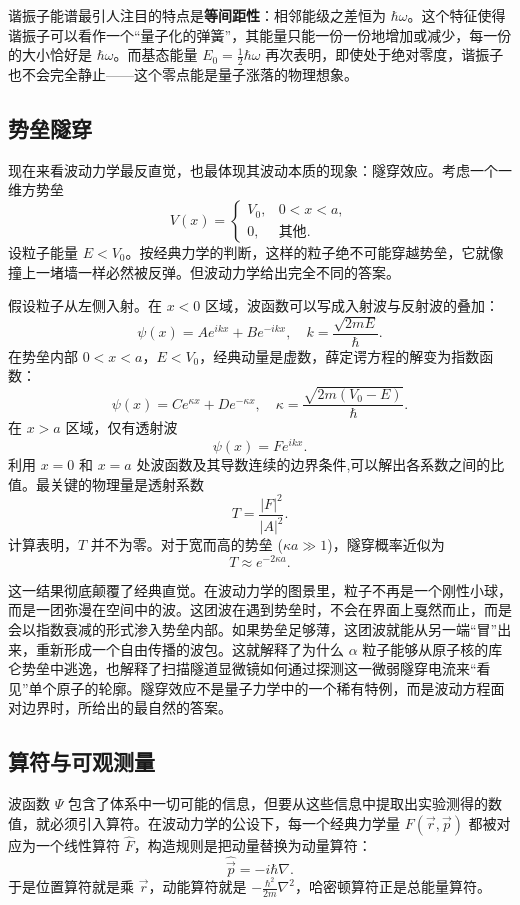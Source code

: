 \documentclass[UTF8]{ctexbook}
\begin{document}
谐振子能谱最引人注目的特点是\textbf{等间距性}：相邻能级之差恒为 $\hbar\omega$。这个特征使得谐振子可以看作一个“量子化的弹簧”，其能量只能一份一份地增加或减少，每一份的大小恰好是 $\hbar\omega$。而基态能量 $E_0 = \frac{1}{2}\hbar\omega$ 再次表明，即使处于绝对零度，谐振子也不会完全静止——这个零点能是量子涨落的物理想象。

\subsection{势垒隧穿}

现在来看波动力学最反直觉，也最体现其波动本质的现象：隧穿效应。考虑一个一维方势垒
\[
V(x) = \begin{cases}
V_0, & 0 < x < a,\\
0, & \text{其他}.
\end{cases}
\]
设粒子能量 $E < V_0$。按经典力学的判断，这样的粒子绝不可能穿越势垒，它就像撞上一堵墙一样必然被反弹。但波动力学给出完全不同的答案。

假设粒子从左侧入射。在 $x < 0$ 区域，波函数可以写成入射波与反射波的叠加：
\[
\psi(x) = A e^{ikx} + B e^{-ikx}, \quad k = \frac{\sqrt{2mE}}{\hbar}.
\]
在势垒内部 $0 < x < a$，$E < V_0$，经典动量是虚数，薛定谔方程的解变为指数函数：
\[
\psi(x) = C e^{\kappa x} + D e^{-\kappa x}, \quad \kappa = \frac{\sqrt{2m(V_0 - E)}}{\hbar}.
\]
在 $x > a$ 区域，仅有透射波
\[
\psi(x) = F e^{ikx}.
\]
利用 $x = 0$ 和 $x = a$ 处波函数及其导数连续的边界条件,可以解出各系数之间的比值。最关键的物理量是透射系数
\[
T = \frac{|F|^2}{|A|^2}.
\]
计算表明，$T$ 并不为零。对于宽而高的势垒 ($\kappa a \gg 1$)，隧穿概率近似为
\[
T \approx e^{-2\kappa a}.
\]

这一结果彻底颠覆了经典直觉。在波动力学的图景里，粒子不再是一个刚性小球，而是一团弥漫在空间中的波。这团波在遇到势垒时，不会在界面上戛然而止，而是会以指数衰减的形式渗入势垒内部。如果势垒足够薄，这团波就能从另一端“冒”出来，重新形成一个自由传播的波包。这就解释了为什么 $\alpha$ 粒子能够从原子核的库仑势垒中逃逸，也解释了扫描隧道显微镜如何通过探测这一微弱隧穿电流来“看见”单个原子的轮廓。隧穿效应不是量子力学中的一个稀有特例，而是波动方程面对边界时，所给出的最自然的答案。

\subsection{算符与可观测量}

波函数 $\Psi$ 包含了体系中一切可能的信息，但要从这些信息中提取出实验测得的数值，就必须引入算符。在波动力学的公设下，每一个经典力学量 $F(\vec{r}, \vec{p})$ 都被对应为一个线性算符 $\hat{F}$，构造规则是把动量替换为动量算符：
\[
\hat{\vec{p}} = -i\hbar \nabla.
\]
于是位置算符就是乘 $\vec{r}$，动能算符就是 $-\frac{\hbar^2}{2m} \nabla^2$，哈密顿算符正是总能量算符。
\end{document}
